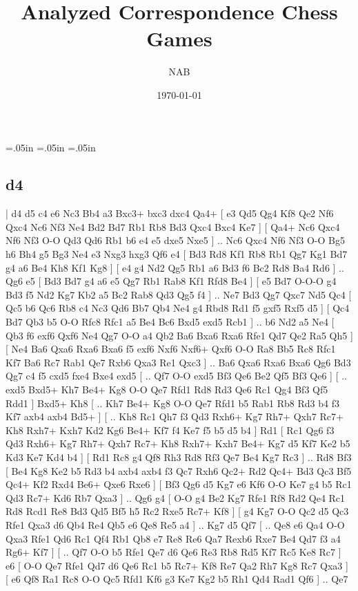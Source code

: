 \documentclass[a4paper,12pt,twoside]{article}
\begin{document}
 \topmargin=.05in
 \leftmargin=.05in
 \rightmargin=.05in
 \title{Analyzed Correspondence Chess Games}
 \author{NAB}
 \date{\today}
 \maketitle{}

\begin{multicols}{3}
\tableofcontents

\section{d4}

%
\makegametitle

|   d4   d5    c4   e6    Nc3   Bb4    a3   Bxc3+    bxc3   dxc4    Qa4+ [  e3 Qd5  Qg4 Kf8  Qe2 Nf6  Qxc4 Nc6  Nf3 Ne4  Bd2 Bd7  Rb1 Rb8  Bd3 Qxc4  Bxc4 Ke7   ]  [  Qa4+ Nc6  Qxc4 Nf6  Nf3 O-O  Qd3 Qd6  Rb1 b6  e4 e5  dxe5 Nxe5   ] .. Nc6    Qxc4   Nf6    Nf3   O-O    Bg5   h6    Bh4   g5    Bg3   Ne4    e3   Nxg3    hxg3   Qf6    e4 [  Bd3 Rd8  Kf1 Rb8  Rb1 Qg7  Kg1 Bd7  g4 a6  Be4 Kh8  Kf1 Kg8   ]  [  e4 g4  Nd2 Qg5  Rb1 a6  Bd3 f6  Bc2 Rd8  Ba4 Rd6   ] .. Qg6    e5 [  Bd3 Bd7  g4 a6  e5 Qg7  Rb1 Rab8  Kf1 Rfd8  Be4   ]  [  e5 Bd7  O-O-O g4  Bd3 f5  Nd2 Kg7  Kb2 a5  Bc2 Rab8  Qd3 Qg5  f4   ] .. Ne7    Bd3   Qg7    Qxc7   Nd5    Qc4 [  Qc5 b6  Qc6 Rb8  c4 Nc3  Qd6 Bb7  Qb4 Ne4  g4 Rbd8  Rd1 f5  gxf5 Rxf5  d5   ]  [  Qc4 Bd7  Qb3 b5  O-O Rfc8  Rfc1 a5  Be4 Bc6  Bxd5 exd5  Rcb1   ] .. b6    Nd2   a5    Ne4 [  Qb3 f6  exf6 Qxf6  Ne4 Qg7  O-O a4  Qb2 Ba6  Bxa6 Rxa6  Rfe1 Qd7  Qe2 Ra5  Qh5   ]  [  Ne4 Ba6  Qxa6 Rxa6  Bxa6 f5  exf6 Nxf6  Nxf6+ Qxf6  O-O Ra8  Bb5 Rc8  Rfc1 Kf7  Ba6 Rc7  Rab1 Qe7  Rxb6 Qxa3  Re1 Qxc3   ] .. Ba6    Qxa6   Rxa6    Bxa6   Qg6    Bd3   Qg7    c4   f5    cxd5   fxe4    Bxe4   exd5 [ .. Qf7  O-O exd5  Bf3 Qe6  Be2 Qf5  Bf3 Qe6   ]  [ .. exd5  Bxd5+ Kh7  Be4+ Kg8  O-O Qe7  Rfd1 Rd8  Rd3 Qe6  Rc1 Qg4  Bf3 Qf5  Rdd1   ]  Bxd5+   Kh8 [ .. Kh7  Be4+ Kg8  O-O Qe7  Rfd1 b5  Rab1 Rb8  Rd3 b4  f3 Kf7  axb4 axb4  Bd5+   ]  [ .. Kh8  Rc1 Qh7  f3 Qd3  Rxh6+ Kg7  Rh7+ Qxh7  Rc7+ Kh8  Rxh7+ Kxh7  Kd2 Kg6  Be4+ Kf7  f4 Ke7  f5 b5  d5 b4   ]  Rd1 [  Rc1 Qg6  f3 Qd3  Rxh6+ Kg7  Rh7+ Qxh7  Rc7+ Kh8  Rxh7+ Kxh7  Be4+ Kg7  d5 Kf7  Ke2 b5  Kd3 Ke7  Kd4 b4   ]  [  Rd1 Rc8  g4 Qf8  Rh3 Rd8  Rf3 Qe7  Be4 Kg7  Rc3   ] .. Rd8    Bf3 [  Be4 Kg8  Ke2 b5  Rd3 b4  axb4 axb4  f3 Qc7  Rxh6 Qc2+  Rd2 Qc4+  Bd3 Qc3  Bf5 Qc4+  Kf2 Rxd4  Be6+ Qxe6  Rxe6   ]  [  Bf3 Qg6  d5 Kg7  e6 Kf6  O-O Ke7  g4 b5  Rc1 Qd3  Rc7+ Kd6  Rb7 Qxa3   ] .. Qg6    g4 [  O-O g4  Be2 Kg7  Rfe1 Rf8  Rd2 Qe4  Rc1 Rd8  Rcd1 Re8  Bd3 Qd5  Bf5 h5  Rc2 Rxe5  Rc7+ Kf8   ]  [  g4 Kg7  O-O Qc2  d5 Qc3  Rfe1 Qxa3  d6 Qb4  Re4 Qb5  e6 Qe8  Re5 a4   ] .. Kg7    d5   Qf7 [ .. Qe8  e6 Qa4  O-O Qxa3  Rfe1 Qd6  Rc1 Qf4  Rb1 Qb8  e7 Re8  Re6 Qa7  Rexb6 Rxe7  Be4 Qd7  f3 a4  Rg6+ Kf7   ]  [ .. Qf7  O-O b5  Rfe1 Qe7  d6 Qe6  Re3 Rb8  Rd5 Kf7  Rc5 Ke8  Rc7   ]  e6 [  O-O Qe7  Rfe1 Qd7  d6 Qe6  Rc1 b5  Rc7+ Kf8  Re7 Qa2  Rh7 Kg8  Rc7 Qxa3   ]  [  e6 Qf8  Ra1 Rc8  O-O Qc5  Rfd1 Kf6  g3 Ke7  Kg2 b5  Rh1 Qd4  Rad1 Qf6   ] .. Qe7   
\end{multicols}
\end{document}
